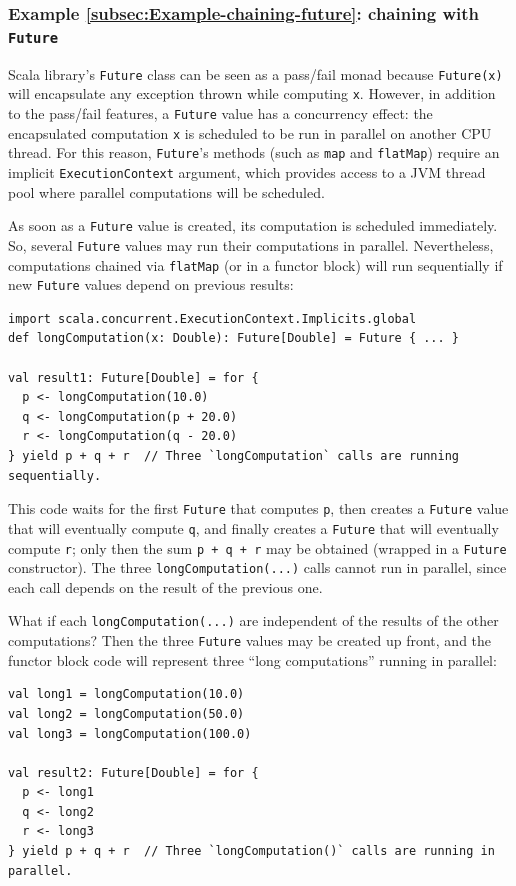 \subsubsection{Example \label{subsec:Example-chaining-future}\ref{subsec:Example-chaining-future}:
chaining with \texttt{Future}}

Scala library\textsf{'}s \lstinline!Future! class can be seen as a pass/fail
monad because \lstinline!Future(x)! will encapsulate any exception
thrown while computing \lstinline!x!. However, in addition to the
pass/fail features, a \lstinline!Future! value has a concurrency
effect: the encapsulated computation \lstinline!x! is scheduled to
be run in parallel on another CPU thread. For this reason, \lstinline!Future!\textsf{'}s
methods (such as \lstinline!map! and \lstinline!flatMap!) require
an implicit \lstinline!ExecutionContext! argument, which provides
access to a JVM thread pool where parallel computations will be scheduled.

As soon as a \lstinline!Future! value is created, its computation
is scheduled immediately. So, several \lstinline!Future! values may
run their computations in parallel. Nevertheless, computations chained
via \lstinline!flatMap! (or in a functor block) will run sequentially
if new \lstinline!Future! values depend on previous results:
\begin{lstlisting}
import scala.concurrent.ExecutionContext.Implicits.global
def longComputation(x: Double): Future[Double] = Future { ... }

val result1: Future[Double] = for {
  p <- longComputation(10.0)
  q <- longComputation(p + 20.0)
  r <- longComputation(q - 20.0)
} yield p + q + r  // Three `longComputation` calls are running sequentially.
\end{lstlisting}
This code waits for the first \lstinline!Future! that computes \lstinline!p!,
then creates a \lstinline!Future! value that will eventually compute
\lstinline!q!, and finally creates a \lstinline!Future! that will
eventually compute \lstinline!r!; only then the sum \lstinline!p + q + r!
may be obtained (wrapped in a \lstinline!Future! constructor). The
three \lstinline!longComputation(...)! calls cannot run in parallel,
since each call depends on the result of the previous one.

What if each \lstinline!longComputation(...)! are independent of
the results of the other computations? Then the three \lstinline!Future!
values may be created up front, and the functor block code will represent
three \textsf{``}long computations\textsf{''} running in parallel:
\begin{lstlisting}
val long1 = longComputation(10.0)
val long2 = longComputation(50.0)
val long3 = longComputation(100.0)

val result2: Future[Double] = for {
  p <- long1
  q <- long2
  r <- long3
} yield p + q + r  // Three `longComputation()` calls are running in parallel.
\end{lstlisting}


